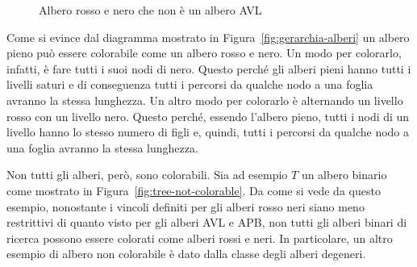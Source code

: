 \begin{figure}[ht!]
\centering
{}
\caption{Albero rosso e nero che non è un albero AVL}\label{fig:rb-not-avl}
\end{figure}


\begin{osservation}
Come si evince dal diagramma mostrato in Figura~\ref{fig:gerarchia-alberi} un albero pieno può essere colorabile come un albero rosso e nero. Un modo per colorarlo, infatti, è fare tutti i suoi nodi di nero. Questo perché gli alberi pieni hanno tutti i livelli saturi e di conseguenza tutti i percorsi da qualche nodo a una foglia avranno la stessa lunghezza. Un altro modo per colorarlo è alternando un livello rosso con un livello nero. Questo perché, essendo l'albero pieno, tutti i nodi di un livello hanno lo stesso numero di figli e, quindi, tutti i percorsi da qualche nodo a una foglia avranno la stessa lunghezza.
\end{osservation}


Non tutti gli alberi, però, sono colorabili. Sia ad esempio $T$ un albero binario come mostrato in Figura~\ref{fig:tree-not-colorable}. Da come si vede da questo esempio, nonostante i vincoli definiti per gli alberi rosso neri siano meno restrittivi di quanto visto per gli alberi AVL e APB, non tutti gli alberi binari di ricerca possono essere colorati come alberi rossi e neri. In particolare, un altro esempio di albero non colorabile è dato dalla classe degli alberi degeneri.

